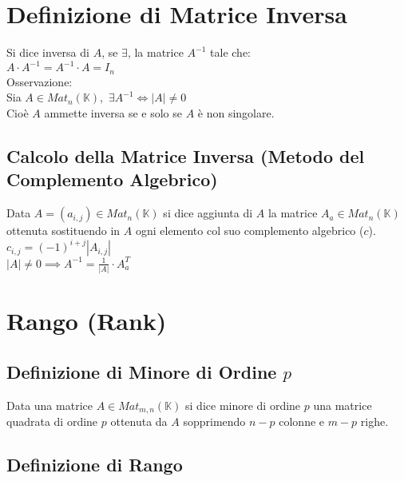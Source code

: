 \documentclass[a4paper, twoside, italian, 11pt]{book}
\newcommand{\K}{\mathbb{K}}
\begin{document}
\section{Definizione di Matrice Inversa}

Si dice inversa di $A$, se $\exists$, la matrice $A^{-1}$ tale che: \\

\noindent
$A \cdot A^{-1} = A^{-1} \cdot A = I_n$ \\

\noindent
Osservazione: \\
Sia $A \in Mat_n(\K),$ $\exists A^{-1} \iff \left | A \right | \neq 0$ \\

\noindent
Cioè $A$ ammette inversa se e solo se $A$ è non singolare.


\subsection{Calcolo della Matrice Inversa (Metodo del Complemento Algebrico)}

Data $A = (a_{i,j}) \in Mat_n(\K)$ si dice aggiunta di $A$ la matrice $A_a \in Mat_n(\K)$ ottenuta sostituendo in $A$ ogni elemento col suo complemento algebrico ($c$). \\

\noindent
$c_{i,j} = (-1)^{i+j} \left | A_{i,j} \right |$ \\

\noindent
$\left | A \right | \neq 0 \implies A^{-1} = \frac{1}{\left | A \right |} \cdot A_a^T$



\section{Rango (Rank)}



\subsection{Definizione di Minore di Ordine $p$}

Data una matrice $A \in Mat_{m,n}(\K)$ si dice minore di ordine $p$ una matrice quadrata di ordine $p$ ottenuta da $A$ sopprimendo $n-p$ colonne e $m-p$ righe.


\subsection{Definizione di Rango}
\end{document}
